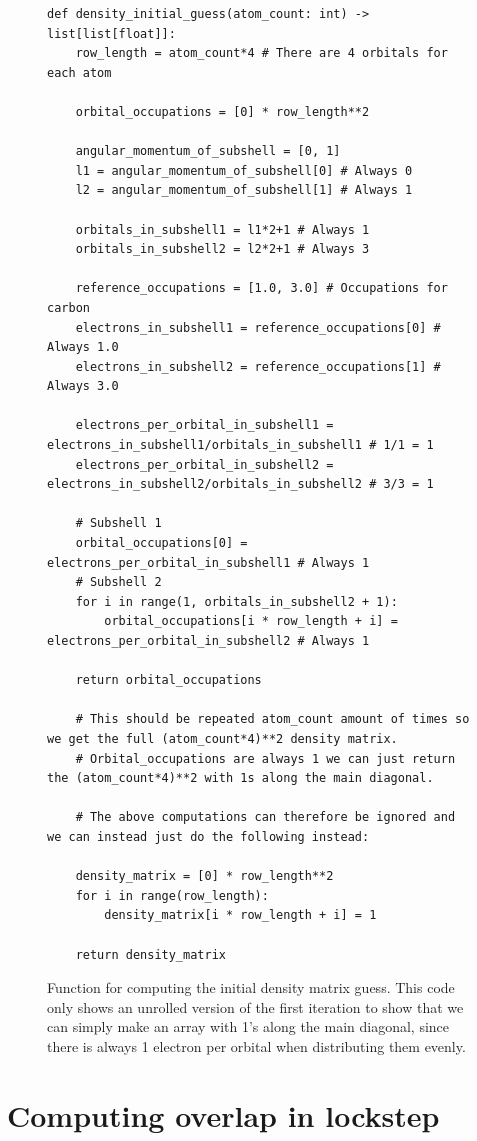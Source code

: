 \begin{figure}[H]
\begin{verbatim}
def density_initial_guess(atom_count: int) -> list[list[float]]:
    row_length = atom_count*4 # There are 4 orbitals for each atom

    orbital_occupations = [0] * row_length**2

    angular_momentum_of_subshell = [0, 1]
    l1 = angular_momentum_of_subshell[0] # Always 0
    l2 = angular_momentum_of_subshell[1] # Always 1

    orbitals_in_subshell1 = l1*2+1 # Always 1
    orbitals_in_subshell2 = l2*2+1 # Always 3

    reference_occupations = [1.0, 3.0] # Occupations for carbon
    electrons_in_subshell1 = reference_occupations[0] # Always 1.0
    electrons_in_subshell2 = reference_occupations[1] # Always 3.0

    electrons_per_orbital_in_subshell1 = electrons_in_subshell1/orbitals_in_subshell1 # 1/1 = 1
    electrons_per_orbital_in_subshell2 = electrons_in_subshell2/orbitals_in_subshell2 # 3/3 = 1

    # Subshell 1
    orbital_occupations[0] = electrons_per_orbital_in_subshell1 # Always 1
    # Subshell 2
    for i in range(1, orbitals_in_subshell2 + 1):
        orbital_occupations[i * row_length + i] = electrons_per_orbital_in_subshell2 # Always 1

    return orbital_occupations

    # This should be repeated atom_count amount of times so we get the full (atom_count*4)**2 density matrix.
    # Orbital_occupations are always 1 we can just return the (atom_count*4)**2 with 1s along the main diagonal.

    # The above computations can therefore be ignored and we can instead just do the following instead:
    
    density_matrix = [0] * row_length**2
    for i in range(row_length):
        density_matrix[i * row_length + i] = 1

    return density_matrix
\end{verbatim}
\caption{Function for computing the initial density matrix guess. This code only shows an unrolled version of the first iteration to show that we can simply make an array with 1's along the main diagonal, since there is always 1 electron per orbital when distributing them evenly.}
\end{figure}


\section{Computing overlap in lockstep}

